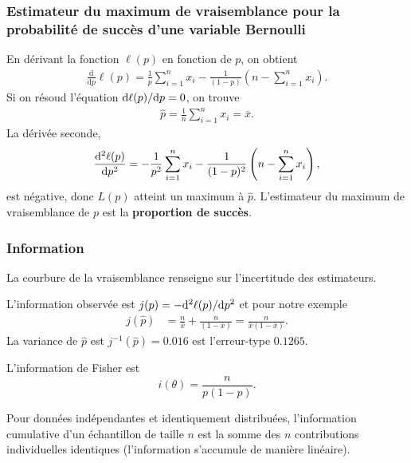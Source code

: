 \documentclass{beamer}
\begin{document}
\begin{frame}
\frametitle{Estimateur du maximum de vraisemblance pour la probabilité de succès d'une variable Bernoulli}
En dérivant la fonction $\ell( p)$ en fonction de $p$, on obtient
\begin{align*}
\frac{\mathrm{d}}{\mathrm{d}p} \ell(p)=\frac{1}{p} \sum_{i=1}^n x_i-\frac{1}{(1-p)}\left(n-\sum_{i=1}^n x_i \right).
\end{align*}
Si on résoud l'équation $\mathrm{d} \ell(p)/\mathrm{d} p
 =0$, on trouve
\begin{align*}
\widehat{p}=\frac{1}{n} \sum_{i=1}^n x_i = \overline{x}.
\end{align*}
La dérivée seconde,
\begin{align*}
 \frac{\mathrm{d}^2 \ell(p)}{\mathrm{d} p^2} = -\frac{1}{p^2} \sum_{i=1}^n x_i-\frac{1}{(1-p)^2}\left(n-\sum_{i=1}^n x_i \right),
\end{align*}
est négative, donc $L(p)$ atteint un maximum à $\widehat{p}$. L'estimateur du maximum de vraisemblance de $p$ est la \textbf{proportion de succès}.
\end{frame}


\begin{frame}
 \frametitle{Information}
 La courbure de la vraisemblance renseigne sur l'incertitude des estimateurs.
 
 L'information observée est $j(p) = - \mathrm{d}^2 \ell(p)/\mathrm{d} p^2$ et pour notre exemple
 \begin{align*}
j(\widehat{p}) &= \frac{n}{\overline{x}} + \frac{n}{(1-\overline{x})} = \frac{n}{\overline{x}(1-\overline{x})}. 
\end{align*}
La variance de $\widehat{p}$ est $j^{-1}(\widehat{p}) = 0.016$ est l'erreur-type $0.1265$.

L'information de Fisher est
\[
i(\theta) = \frac{n}{p(1-p)}.
\]
\bi \item Pour données indépendantes et identiquement distribuées, l'information cumulative d'un échantillon de taille $n$ est la somme des $n$ contributions individuelles identiques (l'information s'accumule de manière linéaire).
\ei
\end{frame}
\end{document}
